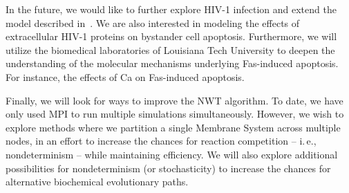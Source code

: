 \documentclass[copyright]{eptcs}
\begin{document}
In the future, we would like to further explore HIV-1 infection and extend the model 
described in~\cite{jack08hiv}.  We are also interested in modeling the effects of 
extracellular HIV-1 proteins on bystander cell apoptosis.  Furthermore, we will utilize the biomedical laboratories of Louisiana Tech University to deepen the understanding of the molecular mechanisms underlying Fas-induced apoptosis.  For instance, the effects of Ca on Fas-induced apoptosis.

Finally, we will look for ways to improve the NWT algorithm.  To date, we have only used MPI to run multiple simulations simultaneously.  However, we wish to explore methods where we partition a single Membrane System across multiple nodes, in an effort to increase the chances for reaction competition -- i.\,e., nondeterminism -- while maintaining efficiency.  We will also explore additional possibilities for nondeterminism (or stochasticity) to increase the chances for alternative biochemical evolutionary paths.



















































\end{document}
